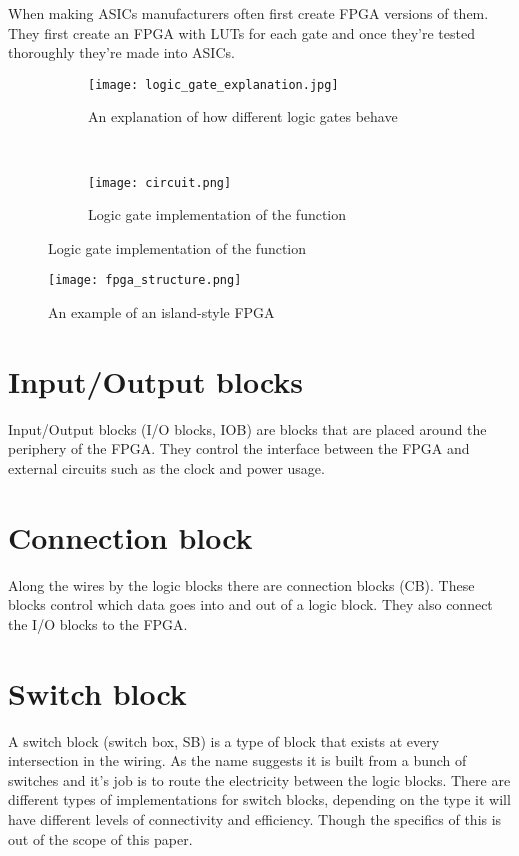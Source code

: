When making ASICs manufacturers often first create FPGA versions of them. They
first create an FPGA with LUTs for each gate and once they're tested thoroughly
they're made into ASICs.

\begin{figure}
    \centering
    \begin{subfigure}[b]{.4\textwidth}
        \centering
        \texttt{[image: logic\_gate\_explanation.jpg]}
        \caption{An explanation of how different logic gates behave\citep{LogicGateBehavior}}
        \label{fig:logic_gate_explanation}
    \end{subfigure}
    ~
    \begin{subfigure}[b]{.4\textwidth}
        \centering
        \texttt{[image: circuit.png]}
        \caption{Logic gate implementation of the function}
        \label{fig:logic_gate_impl}
    \end{subfigure}
\end{figure}

\begin{figure}[H]
    \centering
    \label{fig:fpga_structure}
    \texttt{[image: fpga\_structure.png]}
    \caption{An example of an island-style FPGA\citep{M.MorrisMano3}}
\end{figure}

\section{Input/Output blocks}
Input/Output blocks (I/O blocks, IOB) are blocks that are placed around the
periphery of the FPGA. They control the interface between the FPGA and external
circuits such as the clock and power usage.

\section{Connection block}
Along the wires by the logic blocks there are connection blocks (CB). These blocks
control which data goes into and out of a logic block. They also connect the
I/O blocks to the FPGA.

\section{Switch block}
A switch block (switch box, SB) is a type of block that exists at every
intersection in the wiring. As the name suggests it is built from a bunch of
switches and it's job is to route the electricity between the logic blocks.
There are different types of implementations for switch blocks, depending on
the type it will have different levels of connectivity and efficiency. Though
the specifics of this is out of the scope of this paper.

